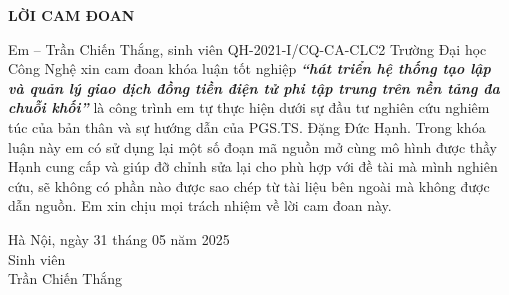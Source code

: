 \setlength{\parindent}{1cm}

\begin{center}
  \textbf{\large{LỜI CAM ĐOAN}	}
\end{center}

Em – Trần Chiến Thắng, sinh viên QH-2021-I/CQ-CA-CLC2 Trường Đại học
Công Nghệ xin cam đoan khóa luận tốt nghiệp \textbf{\textit{“hát triển hệ thống
    tạo lập và quản lý giao dịch đồng tiền điện tử phi tập trung trên nền tảng đa
    chuỗi khối”}} là công trình em tự thực hiện dưới sự đầu tư nghiên cứu nghiêm
túc của bản thân và sự hướng dẫn của PGS.TS. Đặng Đức Hạnh. Trong khóa luận này
em có sử dụng lại một số đoạn mã nguồn mở cùng mô hình được thầy Hạnh cung cấp
và giúp đỡ chỉnh sửa lại cho phù hợp với đề tài mà mình nghiên cứu, sẽ không có
phần nào được sao chép từ tài liệu bên ngoài mà không được dẫn nguồn. Em xin
chịu mọi trách nhiệm về lời cam đoan này.




\vspace{1cm}
\begin{flushright}
  \begin{minipage}{8cm}
    \centering
    Hà Nội, ngày 31 tháng 05 năm 2025\\[0.2cm]
    Sinh viên\\[2.5cm]

    Trần Chiến Thắng
  \end{minipage}
\end{flushright}